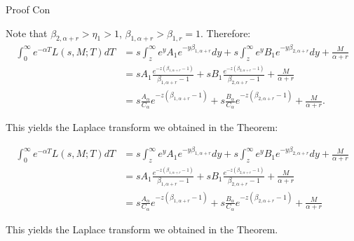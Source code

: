 \documentclass{beamer}
\begin{document}
\begin{frame}{Proof Con}

    {\footnotesize \footnotesize
    \par Note that \(\beta_{2,\alpha+r} > \eta_1 > 1\), \(\beta_{1,\alpha+r} > \beta_{1,r} = 1\). 
    Therefore:
\begin{align*}
\int_{0}^{\infty} e^{-\alpha T} L(s, M; T) dT 
&= s \int_{z}^{\infty} e^{y} A_1 e^{-y\beta_{1,\alpha+r}} dy + s \int_{z}^{\infty} e^{y} B_1 e^{-y\beta_{2,\alpha+r}} dy + \frac{M}{\alpha + r} \\
&= s A_1 \frac{e^{-z(\beta_{1,\alpha+r}-1)}}{\beta_{1,\alpha+r}-1} + s B_1 \frac{e^{-z(\beta_{2,\alpha+r}-1)}}{\beta_{2,\alpha+r}-1} + \frac{M}{\alpha + r} \\
&= s \frac{A_{\alpha}}{C_{\alpha}} e^{-z(\beta_{1,\alpha+r}-1)} + s \frac{B_{\alpha}}{C_{\alpha}} e^{-z(\beta_{2,\alpha+r}-1)} + \frac{M}{\alpha + r}.
\end{align*}

This yields the Laplace transform we obtained in the Theorem:

    \begin{align*}
    \int_{0}^{\infty} e^{-\alpha T} L(s, M; T) dT 
    &= s \int_{z}^{\infty} e^{y} A_1 e^{-y\beta_{1,\alpha+r}} dy + s \int_{z}^{\infty} e^{y} B_1 e^{-y\beta_{2,\alpha+r}} dy + \frac{M}{\alpha + r} \\
    &= s A_1 \frac{e^{-z(\beta_{1,\alpha+r}-1)}}{\beta_{1,\alpha+r}-1} + s B_1 \frac{e^{-z(\beta_{2,\alpha+r}-1)}}{\beta_{2,\alpha+r}-1} + \frac{M}{\alpha + r} \\
    &= s \frac{A_{\alpha}}{C_{\alpha}} e^{-z(\beta_{1,\alpha+r}-1)} + s \frac{B_{\alpha}}{C_{\alpha}} e^{-z(\beta_{2,\alpha+r}-1)} + \frac{M}{\alpha + r}
    \end{align*}

    \par This yields the Laplace transform we obtained in the Theorem.
    }
    
\end{frame}
\end{document}
